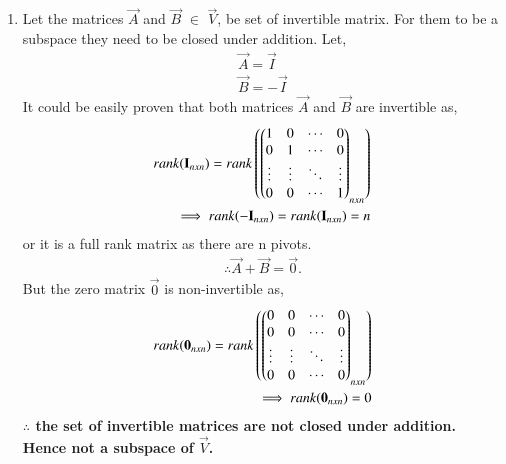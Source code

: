 \begin{enumerate}
\item Let the matrices $\vec{A}$ and $\vec{B}$ $\in$ $\vec{V}$, be set of invertible matrix. For them to be a subspace they need to be closed under addition.
Let,
\begin{align}
\vec{A} = \vec{I}\\
\vec{B} = -\vec{I}
\end{align}  
It could be easily proven that both matrices $\vec{A}$ and $\vec{B}$ are invertible as,
\begin{align}
rank(\mathbf{I}_{nxn}) = rank\left(\begin{pmatrix}1&0&\cdots&0\\0&1&\cdots&0\\\vdots&\vdots&\ddots&\vdots\\0&0&\cdots&1\end{pmatrix}_{nxn}\right)\\\implies rank(\mathbf{-I}_{nxn}) = rank(\mathbf{I}_{nxn}) = n
\label{eq:solutions/2/2/5/i}
\end{align} 
or it is a full rank matrix as there are n pivots.
\begin{align}
\therefore\vec{A}+\vec{B} = \vec{0}. 
\end{align} 
But the zero matrix $\vec{0}$ is non-invertible as,
\begin{align}
rank(\mathbf{0}_{nxn}) = rank\left(\begin{pmatrix}0&0&\cdots&0\\0&0&\cdots&0\\\vdots&\vdots&\ddots&\vdots\\0&0&\cdots&0\end{pmatrix}_{nxn}\right)\\\implies rank(\mathbf{0}_{nxn}) = 0
\end{align} 
\textbf{$\therefore$ the set of invertible matrices are not closed under addition. Hence not a subspace of $\vec{V}$.}


\end{enumerate}
